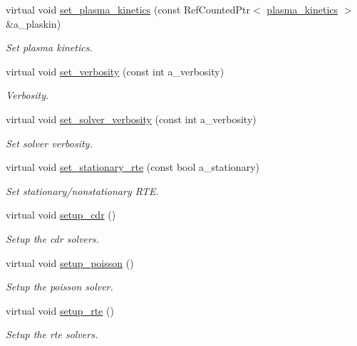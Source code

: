 \begin{DoxyCompactItemize}
virtual void \hyperlink{classtime__stepper_aac84b19b8b7055f97fb2c0215c546e2d}{set\+\_\+plasma\+\_\+kinetics} (const Ref\+Counted\+Ptr$<$ \hyperlink{classplasma__kinetics}{plasma\+\_\+kinetics} $>$ \&a\+\_\+plaskin)
\begin{DoxyCompactList}\small\item\em Set plasma kinetics. \end{DoxyCompactList}\item 
virtual void \hyperlink{classtime__stepper_a11205c272eaabf397637a3a3c29d1b44}{set\+\_\+verbosity} (const int a\+\_\+verbosity)
\begin{DoxyCompactList}\small\item\em Verbosity. \end{DoxyCompactList}\item 
virtual void \hyperlink{classtime__stepper_a3b47b16fff18ede0aad932454fc54cae}{set\+\_\+solver\+\_\+verbosity} (const int a\+\_\+verbosity)
\begin{DoxyCompactList}\small\item\em Set solver verbosity. \end{DoxyCompactList}\item 
virtual void \hyperlink{classtime__stepper_af5ecb8eea37968ce045d49a3bf903f2f}{set\+\_\+stationary\+\_\+rte} (const bool a\+\_\+stationary)
\begin{DoxyCompactList}\small\item\em Set stationary/nonstationary R\+TE. \end{DoxyCompactList}\item 
virtual void \hyperlink{classtime__stepper_a35bf1379bc29fc821e90172f1e053f67}{setup\+\_\+cdr} ()
\begin{DoxyCompactList}\small\item\em Setup the cdr solvers. \end{DoxyCompactList}\item 
virtual void \hyperlink{classtime__stepper_afb043dcafc4d1a6554c26a8a5ec81a0a}{setup\+\_\+poisson} ()
\begin{DoxyCompactList}\small\item\em Setup the poisson solver. \end{DoxyCompactList}\item 
virtual void \hyperlink{classtime__stepper_a312a7def7e73d0e68d28e304fafb7ac2}{setup\+\_\+rte} ()
\begin{DoxyCompactList}\small\item\em Setup the rte solvers. \end{DoxyCompactList}\item 

\end{DoxyCompactItemize}
